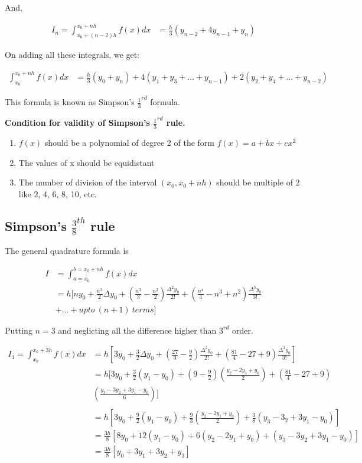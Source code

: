 \documentclass[11pt, a4paper]{article}
\begin{document}
And,

\begin{align*}
  I_n=\int_{x_0+(n-2)h}^{x_0+nh}f(x)dx &= \frac{h}{3}(y_{n-2}+4y_{n-1}+y_n)
\end{align*}

On adding all these integrals, we get:

\begin{align*}
  \int_{x_0}^{x_0+nh}f(x)dx &= \frac{h}{3}(y_0+y_n)+4(y_1+y_3+\dots+y_{n-1})+2(y_2+y_4+\dots+y_{n-2})
\end{align*}

This formula is known as Simpson's $\frac{1}{3}^{rd}$ formula.

\textbf{Condition for validity of Simpson's $\frac{1}{3}^{rd}$ rule.}

\begin{enumerate}
  \item $f(x)$ should be a polynomial of degree 2 of the form $f(x)=a+bx+cx^2$
  \item The values of x should be equidistant
  \item The number of division of the interval $(x_0,x_0+nh)$ should be multiple of 2 like 2, 4, 6, 8, 10, etc.
\end{enumerate}

\subsection{Simpson's $\frac{3}{8}^{th}$ rule}
The general quadrature formula is 

\begin{align*}
  I &=\int_{a=x_0}^{b=x_0+nh}f(x)dx\\
    &= h[ny_0+\frac{n^2}{2}\Delta y_0+(\frac{n^3}{3}-\frac{n^2}{2})\frac{\Delta^2y_0}{2!}+(\frac{n^4}{4}-n^3+n^2)\frac{\Delta^3y_0}{3!}\\
    &+ \dots+upto\ (n+1)\ terms]
\end{align*}

Putting $n=3$ and neglicting all the difference higher than $3^{rd}$ order.

\begin{align*}
  I_1=\int_{x_0}^{x_0+3h}f(x)dx &= h[3y_0+\frac{3}{2}\Delta y_0+(\frac{27}{3}-\frac{9}{2})\frac{\Delta^2y_0}{2!}+(\frac{81}{4}-27+9)\frac{\Delta^3y_0}{3!}]\\
                          &= h[3y_0+\frac{3}{2}(y_1-y_0)+(9-\frac{9}{2})(\frac{y_2-2y_1+y_0}{2})+(\frac{81}{4}-27+9)\\
                          &  (\frac{y_3-3y_2+3y_1-y_0}{6})]\\
                          \ \\ 
                          &= h[3y_0+\frac{9}{2}(y_1-y_0)+\frac{9}{3}(\frac{y_2-2y_1+y_0}{2})+\frac{3}{8}(y_3-3_2+3y_1-y_0)]\\
                          &= \frac{3h}{8}[8y_0+12(y_1-y_0)+6(y_2-2y_1+y_0)+(y_3-3y_2+3y_1-y_0)]\\
                          &= \frac{3h}{8}[y_0+3y_1+3y_2+y_3]\\
\end{align*}
\end{document}
